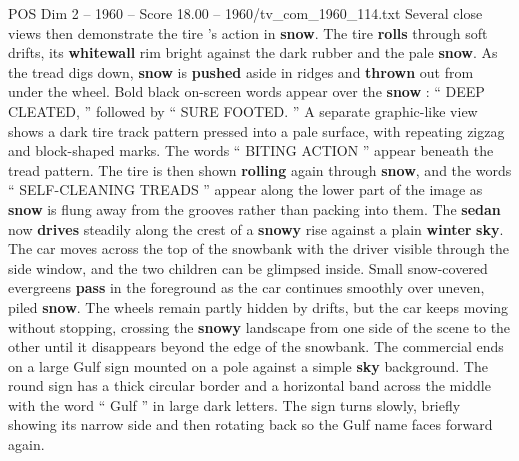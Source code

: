 \begin{textsample}{POS Dim 2 – 1960 – Score 18.00 – 1960/tv\_com\_1960\_114.txt}
Several close views then demonstrate the tire ’s action in \textbf{snow}.
The tire \textbf{rolls} through soft drifts, its \textbf{whitewall} rim bright against the dark rubber and the pale \textbf{snow}.
As the tread digs down, \textbf{snow} is \textbf{pushed} aside in ridges and \textbf{thrown} out from under the wheel.
Bold black on-screen words appear over the \textbf{snow} : “ DEEP CLEATED, ” followed by “ SURE FOOTED. ” A separate graphic-like view shows a dark tire track pattern pressed into a pale surface, with repeating zigzag and block-shaped marks.
The words “ BITING ACTION ” appear beneath the tread pattern.
The tire is then shown \textbf{rolling} again through \textbf{snow}, and the words “ SELF-CLEANING TREADS ” appear along the lower part of the image as \textbf{snow} is flung away from the grooves rather than packing into them.
The \textbf{sedan} now \textbf{drives} steadily along the crest of a \textbf{snowy} rise against a plain \textbf{winter} \textbf{sky}.
The car moves across the top of the snowbank with the driver visible through the side window, and the two children can be glimpsed inside.
Small snow-covered evergreens \textbf{pass} in the foreground as the car continues smoothly over uneven, piled \textbf{snow}.
The wheels remain partly hidden by drifts, but the car keeps moving without stopping, crossing the \textbf{snowy} landscape from one side of the scene to the other until it disappears beyond the edge of the snowbank.
The commercial ends on a large Gulf sign mounted on a pole against a simple \textbf{sky} background.
The round sign has a thick circular border and a horizontal band across the middle with the word “ Gulf ” in large dark letters.
The sign turns slowly, briefly showing its narrow side and then rotating back so the Gulf name faces forward again.

\end{textsample}
